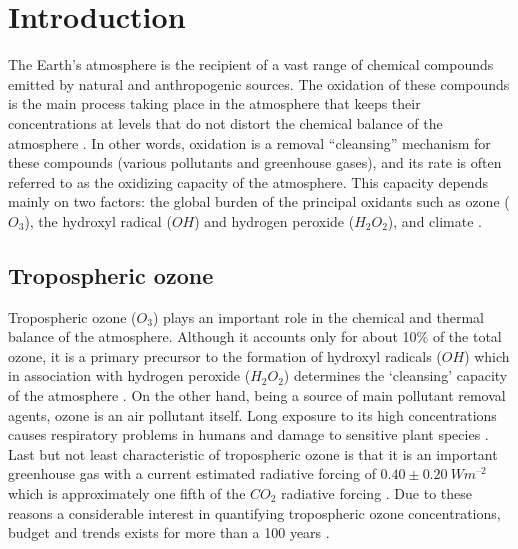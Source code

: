 \documentclass[11pt,a4paper]{article}
\title{\mytitle}
\begin{document}


\tableofcontents
\newpage

\begin{abstract}
Abstract.
\end{abstract}

\section{Introduction} \label{sec:intro}
The Earth’s atmosphere is the recipient of a vast range of chemical compounds emitted by natural and anthropogenic sources. The oxidation of these compounds is the main process taking place in the atmosphere that keeps their concentrations at levels that do not distort the chemical balance of the atmosphere \citep{Prinn2003}. In other words, oxidation is a removal “cleansing” mechanism for these compounds (various pollutants and greenhouse gases), and its rate is often referred to as the oxidizing capacity of the atmosphere. This capacity depends mainly on two factors: the global burden of the principal oxidants such as ozone ($O_3$), the hydroxyl radical ($OH$) and hydrogen peroxide ($H_2O_2$), and climate \citep{Prinn2003,Thompson1992}.

\subsection{Tropospheric ozone}
Tropospheric ozone ($O_3$) plays an important role in the chemical and thermal balance of the atmosphere. Although it accounts only for about 10\% of the total ozone, it is a primary precursor to the formation of hydroxyl radicals ($OH$) which in association with hydrogen peroxide ($H_2O_2$) determines the ‘cleansing’ capacity of the atmosphere \citep{Prinn2003,Tarasick2008,Thompson1992}. On the other hand, being a source of main pollutant removal agents, ozone is an air pollutant itself. Long exposure to its high concentrations causes respiratory problems in humans and damage to sensitive plant species \citep{Fowler2008}. Last but not least characteristic of tropospheric ozone is that it is an important greenhouse gas with a current estimated radiative forcing of  $0.40\pm 0.20~Wm^{–2}$ which is approximately one fifth of the $CO_2$ radiative forcing \citep{Hartmann2013,Myhre2013}. Due to these reasons a considerable interest in quantifying tropospheric ozone concentrations, budget and trends exists for more than a 100 years \citep{Becker2004}.
\end{document}
